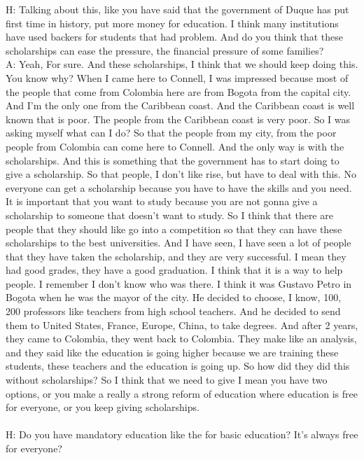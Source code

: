 \documentclass{phyasgn}\usepackage{nag}
\begin{document}
H: Talking about this, like you have said that the government of Duque has put first time in history, put more money for education. I think many institutions have used backers for students that had problem. And do you think that these scholarships can ease the pressure, the financial pressure of some families?\\
A: Yeah, For sure. And these scholarships, I think that we should keep doing this. You know why? When I came here to Connell, I was impressed because most of the people that come from Colombia here are from Bogota from the capital city. And I'm the only one from the Caribbean coast. And the Caribbean coast is well known that is poor. The people from the Caribbean coast is very poor. So I was asking myself what can I do? So that the people from my city, from the poor people from Colombia can come here to Connell. And the only way is with the scholarships. And this is something that the government has to start doing to give a scholarship. So that people, I don't like rise, but have to deal with this. No everyone can get a scholarship because you have to have the skills and you need. It is important that you want to study because you are not gonna give a scholarship to someone that doesn't want to study. So I think that there are people that they should like go into a competition so that they can have these scholarships to the best universities. And I have seen, I have seen a lot of people that they have taken the scholarship, and they are very successful. I mean they had good grades, they have a good graduation. I think that it is a way to help people. I remember I don't know who was there. I think it was Gustavo Petro in Bogota when he was the mayor of the city. He decided to choose, I know, 100, 200 professors like teachers from high school teachers. And he decided to send them to United States, France, Europe, China, to take degrees. And after 2 years, they came to Colombia, they went back to Colombia. They make like an analysis, and they said like the education is going higher because we are training these students, these teachers and the education is going up. So how did they did this without scholarships? So I think that we need to give I mean you have two options, or you make a really a strong reform of education where education is free for everyone, or you keep giving scholarships.\\
\\
H: Do you have mandatory education like the for basic education? It's always free for everyone?\\
\end{document}
